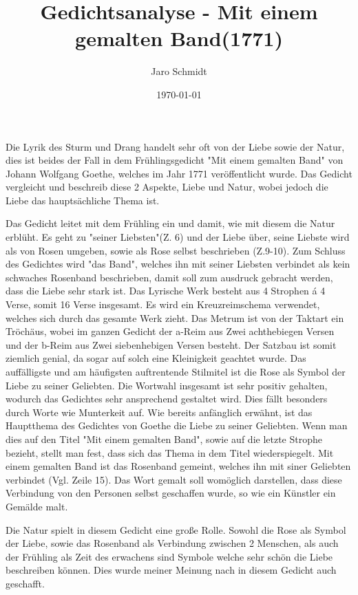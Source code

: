 \documentclass[12pt]{book}
\title{Gedichtsanalyse - Mit einem gemalten Band(1771)}
\author{Jaro Schmidt}
\date{\today}
\begin{document}
	\maketitle
	
	Die Lyrik des Sturm und Drang handelt sehr oft von der Liebe sowie der Natur, dies ist beides der Fall in dem Frühlingsgedicht "Mit einem gemalten Band" von Johann Wolfgang Goethe, welches im Jahr 1771 veröffentlicht wurde.
	Das Gedicht vergleicht und beschreib diese 2 Aspekte, Liebe und Natur, wobei jedoch die Liebe das hauptsächliche Thema ist.

	Das Gedicht leitet mit dem Frühling ein und damit, wie mit diesem die Natur erblüht. Es geht zu "seiner Liebsten"(Z. 6) und der Liebe über, seine Liebste wird als von Rosen umgeben, sowie als Rose selbst beschrieben (Z.9-10).
	Zum Schluss des Gedichtes wird "das Band", welches ihn mit seiner Liebsten verbindet als kein schwaches Rosenband beschrieben, damit soll zum ausdruck gebracht werden, dass die Liebe sehr stark ist.
	Das Lyrische Werk besteht aus 4 Strophen á 4 Verse, somit 16 Verse insgesamt. Es wird ein Kreuzreimschema verwendet, welches sich durch das gesamte Werk zieht.
	Das Metrum ist von der Taktart ein Tröchäus, wobei im ganzen Gedicht der a-Reim aus Zwei achthebiegen Versen und der b-Reim aus Zwei siebenhebigen Versen besteht.
	Der Satzbau ist somit ziemlich genial, da sogar auf solch eine Kleinigkeit geachtet wurde.
	Das auffälligste und am häufigsten auftrentende Stilmitel ist die Rose als Symbol der Liebe zu seiner Geliebten.
	Die Wortwahl insgesamt ist sehr positiv gehalten, wodurch das Gedichtes sehr ansprechend gestaltet wird.
	Dies fällt besonders durch Worte wie Munterkeit auf.
	Wie bereits anfänglich erwähnt, ist das Hauptthema des Gedichtes von Goethe die Liebe zu seiner Geliebten.
	Wenn man dies auf den Titel "Mit einem gemalten Band", sowie auf die letzte Strophe bezieht, stellt man fest, dass sich das Thema in dem Titel wiederspiegelt.
	Mit einem gemalten Band ist das Rosenband gemeint, welches ihn mit siner Geliebten verbindet (Vgl. Zeile 15). Das Wort gemalt soll womöglich darstellen, dass diese Verbindung von den Personen selbst geschaffen wurde, so wie ein Künstler ein Gemälde malt.

	Die Natur spielt in diesem Gedicht eine große Rolle.
	Sowohl die Rose als Symbol der Liebe, sowie das Rosenband als Verbindung zwischen 2 Menschen, als auch der Frühling als Zeit des erwachens sind Symbole welche sehr schön die Liebe beschreiben können. Dies wurde meiner Meinung nach in diesem Gedicht auch geschafft.
\end{document}
